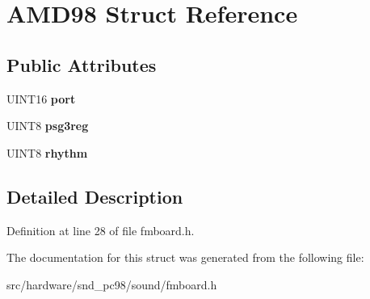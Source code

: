 \hypertarget{structAMD98}{\section{A\-M\-D98 Struct Reference}
\label{structAMD98}
}
\subsection*{Public Attributes}
\begin{DoxyCompactItemize}
\item 
\hypertarget{structAMD98_ae1660f80d0e5bf974bd54c351a7d4998}{U\-I\-N\-T16 {\bfseries port}}\label{structAMD98_ae1660f80d0e5bf974bd54c351a7d4998}

\item 
\hypertarget{structAMD98_a697736e61055d562bdc4b3f65246724d}{U\-I\-N\-T8 {\bfseries psg3reg}}\label{structAMD98_a697736e61055d562bdc4b3f65246724d}

\item 
\hypertarget{structAMD98_a42aa7bc0a53e7edd63bd57ed5dee73b9}{U\-I\-N\-T8 {\bfseries rhythm}}\label{structAMD98_a42aa7bc0a53e7edd63bd57ed5dee73b9}

\end{DoxyCompactItemize}


\subsection{Detailed Description}


Definition at line 28 of file fmboard.\-h.



The documentation for this struct was generated from the following file\-:\begin{DoxyCompactItemize}
\item 
src/hardware/snd\-\_\-pc98/sound/fmboard.\-h\end{DoxyCompactItemize}
